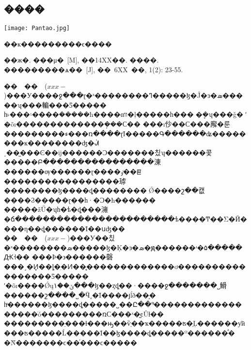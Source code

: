 \documentclass[a4paper,11pt,onecolumn,twoside]{article}
\makeatletter
\newenvironment{figurehere}
  {\def\@captype{figure}}
  {}
\makeatother
\begin{document}
\begin{CJK*}{GBK}{song}
\begin{multicols}{2}
\section{����}
\begin{figurehere}
\centering
\texttt{[image: Pantao.jpg]}
\caption{��ĸ���������ϵ����}\label{fig2}
\end{figurehere}
\small
\begin{thebibliography}{99}
\setlength{\parskip}{0pt}  %
��ж�. ���μ�~[M], ��14XX��.
 ����. ���������ѧ��~[J], ��~6XX~��, 1(2): 23-55.

\end{thebibliography}
\normalsize
{}
\indent ��~~��~~($xxx-$)���У����ջ���ɽ�ˣ��������ߣ�����ɮ�Ĵ�ͽ�ܣ�����ʮ���䡢���Ƽ�����
һ˫���۽����ܿ�����ħ����αװ�ļ�����һ����ܷ�ʮ���ǧ�ʹ�õı�������������ܴ���С��
���ı仯��С���廨�룬���������ء���ռ����ɽΪ�����Գ������ʥ��������ĸ��������ʤ�ᣬ
͵��̫���Ͼ��ĳ������Ͻ�������칬ʮ������콫�����Բ����������������涷������ѹ������ɽ����ٶ��ꡣ
�����������������㻯��������ɮ����ȡ��������׹Ǿ����շ��캢����Ϩ�����ɽ��һ·�Ͻ�ħ������
�����žŰ�ʮһ�ѣ�ȡ���澭�ճ�����������������������ѣ����Ͳ��Σ�Ӣ����η��ȡ������Ϊ��սʤ��\\
\indent ��~~��~~($xxx-$)���У��칬�ˣ��������ܣ�����ɮ�Ķ�ͽ�ܣ�ԭ������ʴ�۵�����Ԫ˧��
���Ϸ�϶������磬���˼�Ͷ̥��ȴ�ִ�Ͷ��̥�������������ơ�����������������Ƽ�����
ʹ�õı����Ǿųݶ��١���ɮ��ȥȡ��·����ջ�������˽䱻������շ����˽�Ӵ˳�Ϊ����յĺð��֣�
һͬ������ɮ����ȡ�����˽��Ը��ºͣ������������������ֺó���������ռС���ˣ�̰ͼŮɫ��
���������ֵ���ɫ���ԣ��ѷֵ��ҡ�����ʦ�ֵĻ������ƴӣ���ʦ�����Ĺ�����Ϊ��ɮ����ȡ�����º������ͣ�
�Ǹ�������ϲ��ͬ���ϲ�����
\end{multicols}
\clearpage
\end{CJK*}
\end{document}
